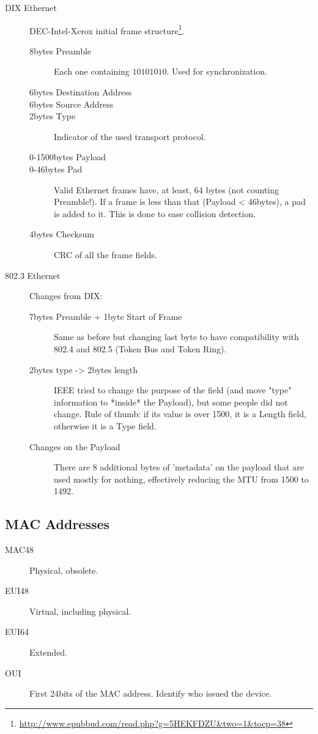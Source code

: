 \documentclass{article}
\begin{document}
\begin{description}
	\item[DIX Ethernet] DEC-Intel-Xerox initial frame structure\footnote{\url{http://www.epubbud.com/read.php?g=5HEKFDZU&two=1&tocp=38}}.
	\begin{description}
    	\item[8bytes Preamble] Each one containing $10101010$. Used for synchronization.
    	\item[6bytes Destination Address]
    	\item[6bytes Source Address]
    	\item[2bytes Type] Indicator of the used transport protocol.
    	\item[0-1500bytes Payload]
    	\item[0-46bytes Pad] Valid Ethernet frames have, at least, 64 bytes (not counting Preamble!). If a frame is less than that (Payload < 46bytes), a pad is added to it. This is done to ease collision detection.
    	\item[4bytes Checksum] CRC of all the frame fields.
	\end{description}
	\item[802.3 Ethernet] Changes from DIX:
	\begin{description}
    	\item[7bytes Preamble + 1byte Start of Frame] Same as before but changing last byte to have compatibility with 802.4 and 802.5 (Token Bus and Token Ring).
    	\item[2bytes type -> 2bytes length] IEEE tried to change the purpose of the field (and move "type" information to *inside* the Payload), but some people did not change. Rule of thumb: if its value is over 1500, it is a Length field, otherwise it is a Type field.
    	\item[Changes on the Payload] There are 8 additional bytes of 'metadata' on the payload that are used mostly for nothing, effectively reducing the MTU from 1500 to 1492.
	\end{description}
	
\end{description}


\subsection{MAC Addresses}

\begin{description}
	\item[MAC48] Physical, obsolete.
	\item[EUI48] Virtual, including physical.
	\item[EUI64] Extended.
	\item[OUI] First 24bits of the MAC address. Identify who issued the device.
\end{description}
\end{document}
